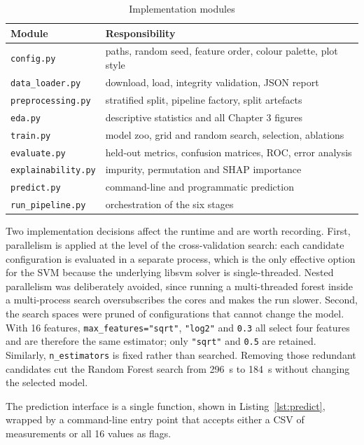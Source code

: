 \begin{table}[htbp]
\centering
\caption{Implementation modules}
\label{tab:modules}
\small
\begin{tabularx}{\textwidth}{@{}lX@{}}
\toprule
\textbf{Module} & \textbf{Responsibility} \\
\midrule
\texttt{config.py} & paths, random seed, feature order, colour palette, plot style \\
\texttt{data\_loader.py} & download, load, integrity validation, JSON report \\
\texttt{preprocessing.py} & stratified split, pipeline factory, split artefacts \\
\texttt{eda.py} & descriptive statistics and all Chapter 3 figures \\
\texttt{train.py} & model zoo, grid and random search, selection, ablations \\
\texttt{evaluate.py} & held-out metrics, confusion matrices, ROC, error analysis \\
\texttt{explainability.py} & impurity, permutation and SHAP importance \\
\texttt{predict.py} & command-line and programmatic prediction \\
\texttt{run\_pipeline.py} & orchestration of the six stages \\
\bottomrule
\end{tabularx}
\end{table}

Two implementation decisions affect the runtime and are worth recording. First,
parallelism is applied at the level of the cross-validation search: each candidate
configuration is evaluated in a separate process, which is the only effective
option for the SVM because the underlying libsvm solver is single-threaded. Nested
parallelism was deliberately avoided, since running a multi-threaded forest inside
a multi-process search oversubscribes the cores and makes the run slower.
Second, the search spaces were pruned of configurations that cannot change the
model. With 16 features, \texttt{max\_features="sqrt"}, \texttt{"log2"} and
\texttt{0.3} all select four features and are therefore the same estimator; only
\texttt{"sqrt"} and \texttt{0.5} are retained. Similarly,
\texttt{n\_estimators} is fixed rather than searched. Removing those redundant
candidates cut the Random Forest search from 296~s to 184~s without changing the
selected model.

The prediction interface is a single function, shown in
Listing~\ref{lst:predict}, wrapped by a command-line entry point that accepts
either a CSV of measurements or all 16 values as flags.


